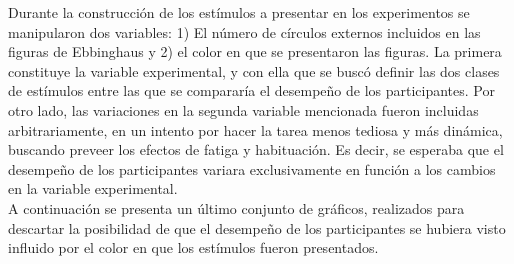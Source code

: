 Durante la construcción de los estímulos a presentar en los experimentos se manipularon dos variables: 1) El número de círculos externos incluidos en las figuras de Ebbinghaus y 2) el color en que se presentaron las figuras. La primera constituye la variable experimental, y con ella que se buscó definir las dos clases de estímulos entre las que se compararía el desempeño de los participantes. Por otro lado, las variaciones en la segunda variable mencionada fueron incluidas arbitrariamente, en un intento por hacer la tarea menos tediosa y más dinámica, buscando preveer los efectos de fatiga y habituación. Es decir, se esperaba que el desempeño de los participantes variara exclusivamente en función a los cambios en la variable experimental.\\

A continuación se presenta un último conjunto de gráficos, realizados para descartar la posibilidad de que el desempeño de los participantes se hubiera visto influido por el color en que los estímulos fueron presentados.\\

